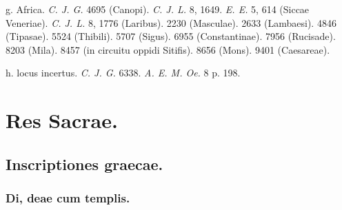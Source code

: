 \documentclass[a4paper, 11pt, oneside, polutonikogreek, german]{article}
\begin{document}
g. Africa. \emph{C. J. G.} 4695 (Canopi). \emph{C. J. L.} 8, 1649. \emph{E. E.} 5, 614 (Siccae Veneriae). \emph{C. J. L.} 8, 1776 (Laribus). 2230 (Masculae). 2633 (Lambaesi). 4846 (Tipasae). 5524 (Thibili). 5707 (Sigus). 6955 (Constantinae). 7956 (Rucisade). 8203 (Mila). 8457 (in circuitu oppidi Sitifis). 8656 (Mons). 9401 (Caesareae).

h. locus incertus. \emph{C. J. G.} 6338. \emph{A. E. M. Oe.} 8 p. 198.
\clearpage
\section{Res Sacrae.}
\subsection{Inscriptiones graecae.}
\subsubsection{Di, deae cum templis.}
\end{document}
